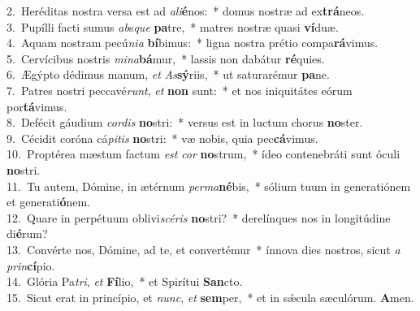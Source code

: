 {2.~}Heréditas nostra versa est ad \textit{a}\textit{li}\textbf{é}nos:~* domus nostræ ad ex\textbf{trá}neos.\\
{3.~}Pupílli facti sumus \textit{ab}s\textit{que} \textbf{pa}tre,~* matres nostræ quasi \textbf{ví}duæ.\\
{4.~}Aquam nostram pecú\textit{ni}\textit{a} \textbf{bí}bimus:~* ligna nostra prétio compa\textbf{rá}vimus.\\
{5.~}Cervícibus nostris \textit{mi}\textit{na}\textbf{bá}mur,~* lassis non dabátur \textbf{ré}quies.\\
{6.~}Ægýpto dédimus manum, \textit{et} \textit{As}\textbf{sý}riis,~* ut saturarémur \textbf{pa}ne.\\
{7.~}Patres nostri peccavé\textit{runt}, \textit{et} \textbf{non} sunt:~* et nos iniquitátes eórum por\textbf{tá}vimus.\\
{8.~}Defécit gáudium \textit{cor}\textit{dis} \textbf{no}stri:~* versus est in luctum chorus \textbf{no}ster.\\
{9.~}Cécidit coróna cá\textit{pi}\textit{tis} \textbf{no}stri:~* væ nobis, quia pec\textbf{cá}vimus.\\
{10.~}Proptérea mæstum factum \textit{est} \textit{cor} \textbf{no}strum,~* ídeo contenebráti sunt óculi \textbf{no}stri.\\
{11.~}Tu autem, Dómine, in ætérnum \textit{per}\textit{ma}\textbf{né}bis,~* sólium tuum in generatiónem et generati\textbf{ó}nem.\\
{12.~}Quare in perpétuum oblivi\textit{scé}\textit{ris} \textbf{no}stri?~* derelínques nos in longitúdine di\textbf{é}rum?\\
{13.~}Convérte nos, Dómine, ad te, et convertémur~* ínnova dies nostros, sicut \textit{a} \textit{prin}\textbf{cí}pio.\\
{14.~}Glória Pa\textit{tri}, \textit{et} \textbf{Fí}lio,~* et Spirítui \textbf{San}cto.\\
{15.~}Sicut erat in princípio, et \textit{nunc}, \textit{et} \textbf{sem}per,~* et in sǽcula sæculórum. \textbf{A}men.\\

